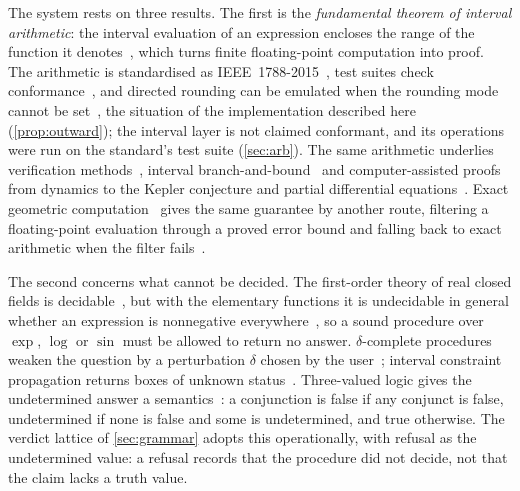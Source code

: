 \documentclass[preprint,11pt,a4paper]{elsarticle}
\theoremstyle{definition}
\begin{document}
The system rests on three results. The first is the \emph{fundamental theorem of interval arithmetic}: the interval evaluation of an expression encloses the range of the function it denotes~\citep{Moore79,Moore09,Neumaier90}, which turns finite floating-point computation into proof. The arithmetic is standardised as IEEE~1788-2015~\citep{IEEE1788std,Revol17}, test suites check conformance~\citep{Benet24}, and directed rounding can be emulated when the rounding mode cannot be set~\citep{Rump16fixed}, the situation of the implementation described here (\cref{prop:outward}); the interval layer is not claimed conformant, and its operations were run on the standard's test suite (\cref{sec:arb}). The same arithmetic underlies verification methods~\citep{Rump10,Rump99,Johansson17}, interval branch-and-bound~\citep{HansenWalster04,Kearfott96,Neumaier04,Rump18global} and computer-assisted proofs from dynamics to the Kepler conjecture and partial differential equations~\citep{Tucker02,Immler18,Hales17,GomezSerrano19,NakaoPlumWatanabe19}. Exact geometric computation~\citep{Yap97} gives the same guarantee by another route, filtering a floating-point evaluation through a proved error bound and falling back to exact arithmetic when the filter fails~\citep{Fortune96,Shewchuk97}.

The second concerns what cannot be decided. The first-order theory of real closed fields is decidable~\citep{Tarski51}, but with the elementary functions it is undecidable in general whether an expression is nonnegative everywhere~\citep{Richardson68}, so a sound procedure over $\exp$, $\log$ or $\sin$ must be allowed to return no answer. $\delta$-complete procedures weaken the question by a perturbation $\delta$ chosen by the user~\citep{GaoAvigadClarke12,dReal13}; interval constraint propagation returns boxes of unknown status~\citep{Loup13}. Three-valued logic gives the undetermined answer a semantics~\citep{Kleene38}: a conjunction is false if any conjunct is false, undetermined if none is false and some is undetermined, and true otherwise. The verdict lattice of \cref{sec:grammar} adopts this operationally, with refusal as the undetermined value: a refusal records that the procedure did not decide, not that the claim lacks a truth value.
\end{document}
